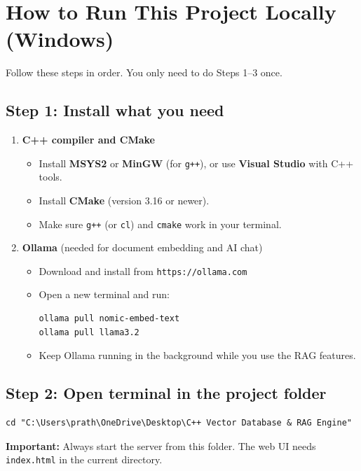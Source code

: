\documentclass[11pt]{article}
\begin{document}
\section*{How to Run This Project Locally (Windows)}

Follow these steps in order. You only need to do Steps 1--3 once.

\subsection*{Step 1: Install what you need}

\begin{enumerate}[leftmargin=*]
  \item \textbf{C++ compiler and CMake}
  \begin{itemize}
    \item Install \textbf{MSYS2} or \textbf{MinGW} (for \texttt{g++}), or use \textbf{Visual Studio} with C++ tools.
    \item Install \textbf{CMake} (version 3.16 or newer).
    \item Make sure \texttt{g++} (or \texttt{cl}) and \texttt{cmake} work in your terminal.
  \end{itemize}

  \item \textbf{Ollama} (needed for document embedding and AI chat)
  \begin{itemize}
    \item Download and install from \texttt{https://ollama.com}
    \item Open a new terminal and run:
\begin{lstlisting}
ollama pull nomic-embed-text
ollama pull llama3.2
\end{lstlisting}
    \item Keep Ollama running in the background while you use the RAG features.
  \end{itemize}
\end{enumerate}

\subsection*{Step 2: Open terminal in the project folder}

\begin{lstlisting}
cd "C:\Users\prath\OneDrive\Desktop\C++ Vector Database & RAG Engine"
\end{lstlisting}

\textbf{Important:} Always start the server from this folder. The web UI needs \texttt{index.html} in the current directory.
\end{document}
